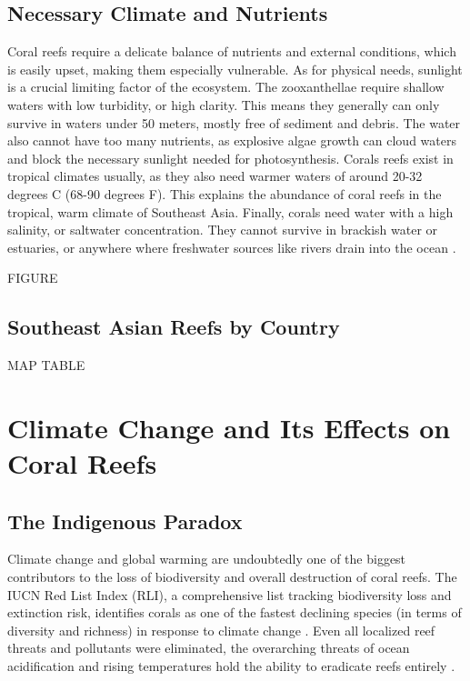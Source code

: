 \documentclass{book}\usepackage{knitr}
\begin{document}
\subsection{Necessary Climate and Nutrients}

Coral reefs require a delicate balance of nutrients and external conditions, which is easily upset, making them especially vulnerable. As for physical needs, sunlight is a crucial limiting factor of the ecosystem. The zooxanthellae require shallow waters with low turbidity, or high clarity. This means they generally can only survive in waters under 50 meters, mostly free of sediment and debris. The water also cannot have too many nutrients, as explosive algae growth can cloud waters and block the necessary sunlight needed for photosynthesis. Corals reefs exist in tropical climates usually, as they also need warmer waters of around 20-32 degrees C (68-90 degrees F). This explains the abundance of coral reefs in the tropical, warm climate of Southeast Asia. Finally, corals need water with a high salinity, or saltwater concentration. They cannot survive in brackish water or estuaries, or anywhere where freshwater sources like rivers drain into the ocean \citep{https://doi.org/10.1002/fee.2088}.

FIGURE

\subsection{Southeast Asian Reefs by Country}

MAP
TABLE

\section{Climate Change and Its Effects on Coral Reefs}

\subsection{The Indigenous Paradox}

Climate change and global warming are undoubtedly one of the biggest contributors to the loss of biodiversity and overall destruction of coral reefs. The IUCN Red List Index (RLI), a comprehensive list tracking biodiversity loss and extinction risk, identifies corals as one of the fastest declining species (in terms of diversity and richness) in response to climate change \citep{wwfindex}. Even all localized reef threats and pollutants were eliminated, the overarching threats of ocean acidification and rising temperatures hold the ability to eradicate reefs entirely \citep{Keller2009ClimateCC}.
\end{document}
